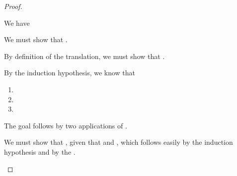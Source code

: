 \begin{proof}
\begin{proofcases}
    \item {}

      We have
      \im{
        \inferrule*[right=\rulename{Red-Cong-Code}]
        {\tstepjudg[\stepstar]{\tlenv}{\tAone}{\tAonepr} \\
         \tstepjudg[\stepstar]{\tlenv,\tn:\tAonepr}{\tAtwo}{\tAtwopr} \\
         \tstepjudg[\stepstar]{\tlenv,\tn:\tAonepr,\tx:\tAtwopr}{\te}{\tepr}}
        {\tstepjudg[\stepstar]{\tlenv}{\tnfune{(\tn:\tAone,\tx:\tAtwo)}{\te}}{\tnfune{(\tn:\tAonepr,\tx:\tAtwopr)}{\tepr}}}
      }

      We must show that \im{\absccmodel{\tnfune{(\tn:\tAone,\tx:\tAtwo)}{\te}}
        \stepstar \absccmodel{{\tnfune{(\tn:\tAonepr,\tx:\tAtwopr)}{\tepr}}}}.

      By definition of the translation, we must show that
      \im{\sfune{\sn}{\absccmodel{\tAone}}{\sfune{\tx}{\absccmodel{\tAtwo}}{\absccmodel{\te}}}
        \stepstar
        \sfune{\sn}{\absccmodel{\tAonepr}}{\sfune{\sx}{\absccmodel{\tAtwopr}{\absccmodel{\tepr}}}}}.

      By the induction hypothesis, we know that
      \begin{enumerate}
        \item \im{\absccmodel{\tAone} \stepstar \absccmodel{\tAonepr}}
        \item \im{\absccmodel{\tAtwo} \stepstar \absccmodel{\tAtwopr}}
        \item \im{\absccmodel{\te} \stepstar \absccmodel{\tepr}}
      \end{enumerate}

      The goal follows by two applications of \slang {}.

    \item {}

      We must show that \im{\absccmodel{{\tcloe{\teone}{\tetwo}}} \stepstar
        \absccmodel{\tcloe{\teonepr}{\tetwopr}}}, given that \im{\teone
        \stepstar \teonepr} and \im{\tetwo \stepstar \tetwopr}, which follows
      easily by the induction hypothesis and by the \slang
      .
  \end{proofcases}
\end{proof}

